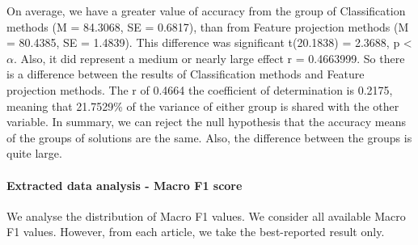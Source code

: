 \documentclass[
]{article}
\newenvironment{Shaded}{\begin{snugshade}}{\end{snugshade}}
\newcommand{\AttributeTok}[1]{\textcolor[rgb]{0.77,0.63,0.00}{#1}}
\newcommand{\DecValTok}[1]{\textcolor[rgb]{0.00,0.00,0.81}{#1}}
\newcommand{\FunctionTok}[1]{\textcolor[rgb]{0.00,0.00,0.00}{#1}}
\newcommand{\NormalTok}[1]{#1}
\newcommand{\OtherTok}[1]{\textcolor[rgb]{0.56,0.35,0.01}{#1}}
\newcommand{\SpecialCharTok}[1]{\textcolor[rgb]{0.00,0.00,0.00}{#1}}
\newcommand{\StringTok}[1]{\textcolor[rgb]{0.31,0.60,0.02}{#1}}
\begin{document}
On average, we have a greater value of accuracy from the group of Classification methods (M = 84.3068, SE = 0.6817), than from Feature projection methods (M = 80.4385, SE = 1.4839). This difference was significant t(20.1838) = 2.3688, p \textless{} \(\alpha\). Also, it did represent a medium or nearly large effect r = 0.4663999. So there is a difference between the results of Classification methods and Feature projection methods. The r of 0.4664 the coefficient of determination is 0.2175, meaning that 21.7529\% of the variance of either group is shared with the other variable. In summary, we can reject the null hypothesis that the accuracy means of the groups of solutions are the same. Also, the difference between the groups is quite large.

\hypertarget{extracted-data-analysis---macro-f1-score}{%
\paragraph{Extracted data analysis - Macro F1 score}\label{extracted-data-analysis---macro-f1-score}}

We analyse the distribution of Macro F1 values. We consider all available Macro F1 values. However, from each article, we take the best-reported result only.

\begin{Shaded}
\end{Shaded}
\end{document}
